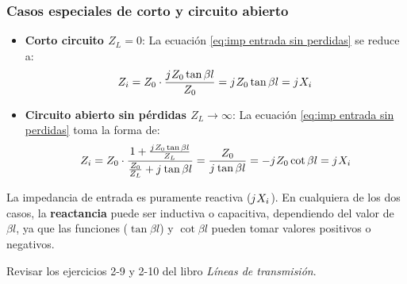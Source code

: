 \documentclass[
	12pt, %
	fleqn, %
	a4paper, %
	oneside, %
]{LegrandOrangeBook}
\begin{document}
\subsubsection*{Casos especiales de corto y circuito abierto}
\begin{itemize}
\item \textbf{Corto circuito $Z_L=0$}: La ecuación \ref{eq:imp entrada sin perdidas} se reduce a:
\begin{equation}
Z_i=Z_0\cdot\frac{{j\mkern1mu} Z_0\tan\beta l}{Z_0}={j\mkern1mu} Z_0\tan\beta l={j\mkern1mu} X_i
\label{eq:corto sin perdidas}
\end{equation}
\item \textbf{Circuito abierto sin pérdidas $Z_L\rightarrow\infty$}: La ecuación \ref{eq:imp entrada sin perdidas} toma la forma de:
\begin{equation}
Z_i=Z_0\cdot\frac{1+\frac{{j\mkern1mu} Z_0\tan\beta l}{Z_L}}{\frac{Z_0}{Z_L}+{j\mkern1mu}\tan\beta l}=\frac{Z_0}{{j\mkern1mu}\tan\beta l}=-{j\mkern1mu} Z_0\cot\beta l={j\mkern1mu} X_i
\end{equation}
\end{itemize}
La impedancia de entrada es puramente reactiva (${j\mkern1mu} X_i$). En cualquiera de los dos casos, la \textbf{reactancia }puede ser inductiva o capacitiva, dependiendo del valor de $\beta l$, ya que las funciones ($\tan\beta l$) y $\cot\beta l$ pueden tomar valores positivos o negativos.
\begin{notation}
Revisar los ejercicios 2-9 y 2-10 del libro \emph{Líneas de transmisión}\cite{velalineas1999}.
\end{notation}
\end{document}
